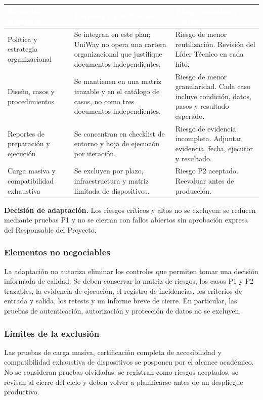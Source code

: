 \documentclass[11pt,a4paper]{article}
\newcommand{\thead}[1]{\textcolor{white}{\textbf{#1}}}
\begin{document}
\begin{tabularx}{\textwidth}{p{4.0cm}YY}
\thead{Elemento adaptado} & \thead{Decisión y justificación} & \thead{Riesgo asumido y control}\\
\midrule
Política y estrategia organizacional & Se integran en este plan; UniWay no opera una cartera organizacional que justifique documentos independientes. & Riesgo de menor reutilización. Revisión del Líder Técnico en cada hito.\\
Diseño, casos y procedimientos & Se mantienen en una matriz trazable y en el catálogo de casos, no como tres documentos independientes. & Riesgo de menor granularidad. Cada caso incluye condición, datos, pasos y resultado esperado.\\
Reportes de preparación y ejecución & Se concentran en checklist de entorno y hoja de ejecución por iteración. & Riesgo de evidencia incompleta. Adjuntar evidencia, fecha, ejecutor y resultado.\\
Carga masiva y compatibilidad exhaustiva & Se excluyen por plazo, infraestructura y matriz limitada de dispositivos. & Riesgo P2 aceptado. Reevaluar antes de producción.\\
\end{tabularx}

\medskip
\noindent\textbf{Decisión de adaptación.} Los riesgos críticos y altos no se excluyen: se reducen mediante pruebas P1 y no se cierran con fallos abiertos sin aprobación expresa del Responsable del Proyecto.

\subsubsection{Elementos no negociables}
La adaptación no autoriza eliminar los controles que permiten tomar una decisión informada de calidad. Se deben conservar la matriz de riesgos, los casos P1 y P2 trazables, la evidencia de ejecución, el registro de incidencias, los criterios de entrada y salida, los retests y un informe breve de cierre. En particular, las pruebas de autenticación, autorización y protección de datos no se excluyen.

\subsubsection{Límites de la exclusión}
Las pruebas de carga masiva, certificación completa de accesibilidad y compatibilidad exhaustiva de dispositivos se posponen por el alcance académico. No se consideran pruebas olvidadas: se registran como riesgos aceptados, se revisan al cierre del ciclo y deben volver a planificarse antes de un despliegue productivo.
\end{document}
